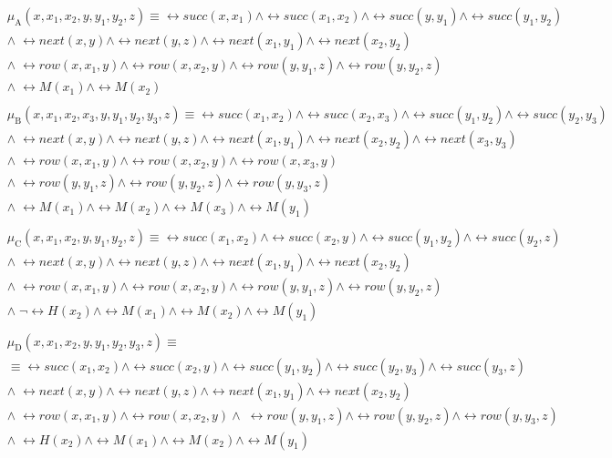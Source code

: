 \documentclass{lmcs}
\begin{document}
\begin{align}
&\mu_\mathrm{A}(x,x_1,x_2,y,y_1,y_2,z) \equiv \rel{succ}(x,x_1)\wedge\rel{succ}(x_1,x_2)\wedge\rel{succ}(y,y_1)\wedge\rel{succ}(y_1,y_2)\nonumber\\
&\wedge\;\rel{next}(x,y)\wedge\rel{next}(y,z)\wedge\rel{next}(x_1,y_1)\wedge\rel{next}(x_2,y_2)\nonumber\\
&\wedge\;\rel{row}(x,x_1,y)\wedge\rel{row}(x,x_2,y)\wedge\rel{row}(y,y_1,z)\wedge\rel{row}(y,y_2,z)\nonumber\\
&\wedge\;\rel{M}(x_1)\wedge\rel{M}(x_2)\label{eq:marked_a}\\
&\nonumber\\
&\mu_\mathrm{B}(x,x_1,x_2,x_3,y,y_1,y_2,y_3,z) \equiv\rel{succ}(x_1,x_2)\wedge\rel{succ}(x_2,x_3)\wedge\rel{succ}(y_1,y_2)\wedge\rel{succ}(y_2,y_3)\nonumber\\
&\wedge\;\rel{next}(x,y)\wedge\rel{next}(y,z)\wedge\rel{next}(x_1,y_1)\wedge\rel{next}(x_2,y_2)\wedge\rel{next}(x_3,y_3)\nonumber\\
&\wedge\;\rel{row}(x,x_1,y)\wedge\rel{row}(x,x_2,y)\wedge\rel{row}(x,x_3,y)\nonumber\\
&\wedge\;\rel{row}(y,y_1,z)\wedge\rel{row}(y,y_2,z)\wedge\rel{row}(y,y_3,z)\nonumber\\
&\wedge\;\rel{M}(x_1)\wedge\rel{M}(x_2)\wedge\rel{M}(x_3)\wedge\rel{M}(y_1)\label{eq:marked_b}\\
&\nonumber\\
&\mu_\mathrm{C}(x,x_1,x_2,y,y_1,y_2,z) \equiv\rel{succ}(x_1,x_2)\wedge\rel{succ}(x_2,y)\wedge\rel{succ}(y_1,y_2)\wedge\rel{succ}(y_2,z)\nonumber\\
&\wedge\;\rel{next}(x,y)\wedge\rel{next}(y,z)\wedge\rel{next}(x_1,y_1)\wedge\rel{next}(x_2,y_2)\nonumber\\
&\wedge\;\rel{row}(x,x_1,y)\wedge\rel{row}(x,x_2,y)\wedge\rel{row}(y,y_1,z)\wedge\rel{row}(y,y_2,z)\nonumber\\
&\wedge\;\neg\rel{H}(x_2)\wedge\rel{M}(x_1)\wedge\rel{M}(x_2)\wedge\rel{M}(y_1)\label{eq:marked_c}\\
&\nonumber\\
&\mu_\mathrm{D}(x,x_1,x_2,y,y_1,y_2,y_3,z) \equiv\nonumber\\
&\equiv\rel{succ}(x_1,x_2)\wedge\rel{succ}(x_2,y)\wedge\rel{succ}(y_1,y_2)\wedge\rel{succ}(y_2,y_3)\wedge\rel{succ}(y_3,z)\nonumber\\
&\wedge\;\rel{next}(x,y)\wedge\rel{next}(y,z)\wedge\rel{next}(x_1,y_1)\wedge\rel{next}(x_2,y_2)\nonumber\\
&\wedge\;\rel{row}(x,x_1,y)\wedge\rel{row}(x,x_2,y)\wedge\;\rel{row}(y,y_1,z)\wedge\rel{row}(y,y_2,z)\wedge\rel{row}(y,y_3,z)\nonumber\\
&\wedge\;\rel{H}(x_2)\wedge\rel{M}(x_1)\wedge\rel{M}(x_2)\wedge\rel{M}(y_1)\label{eq:marked_d}
\end{align}
\end{document}
